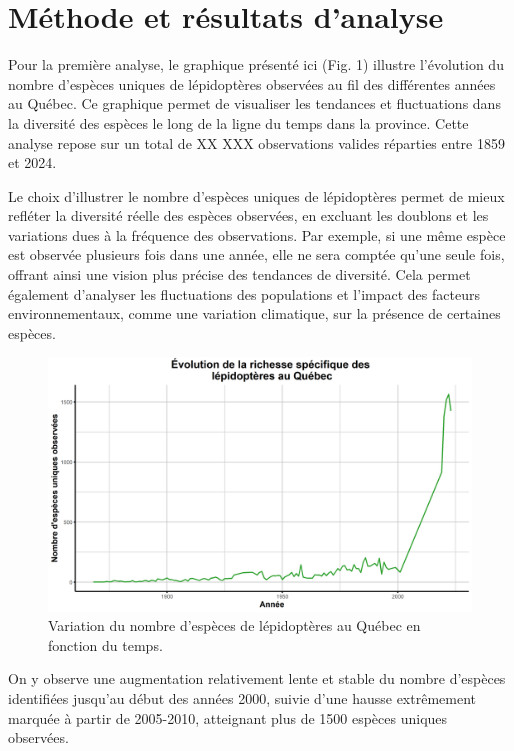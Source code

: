 \documentclass[9pt,twocolumn,twoside,]{pnas-new}
\begin{document}
\section{Méthode et résultats
d'analyse}\label{muxe9thode-et-ruxe9sultats-danalyse}

Pour la première analyse, le graphique présenté ici (Fig. 1) illustre
l'évolution du nombre d'espèces uniques de lépidoptères observées au fil
des différentes années au Québec. Ce graphique permet de visualiser les
tendances et fluctuations dans la diversité des espèces le long de la
ligne du temps dans la province. Cette analyse repose sur un total de XX
XXX observations valides réparties entre 1859 et 2024.

Le choix d'illustrer le nombre d'espèces uniques de lépidoptères permet
de mieux refléter la diversité réelle des espèces observées, en excluant
les doublons et les variations dues à la fréquence des observations. Par
exemple, si une même espèce est observée plusieurs fois dans une année,
elle ne sera comptée qu'une seule fois, offrant ainsi une vision plus
précise des tendances de diversité. Cela permet également d'analyser les
fluctuations des populations et l'impact des facteurs environnementaux,
comme une variation climatique, sur la présence de certaines espèces.

\begin{figure}
\includegraphics[width=0.9\linewidth]{graphique_biodiversite} \caption{Variation du nombre d'espèces de lépidoptères au Québec en fonction du temps.}\label{fig:fig_graphique_biodiversite}
\end{figure}

On y observe une augmentation relativement lente et stable du nombre
d'espèces identifiées jusqu'au début des années 2000, suivie d'une
hausse extrêmement marquée à partir de 2005-2010, atteignant plus de
1500 espèces uniques observées.
\end{document}

